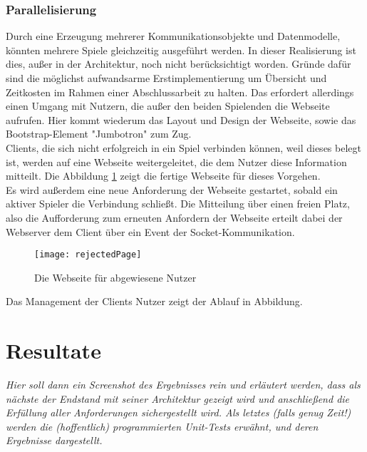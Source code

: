 \subsubsection{Parallelisierung}

Durch eine Erzeugung mehrerer Kommunikationsobjekte und Datenmodelle, könnten mehrere Spiele gleichzeitig ausgeführt werden. In dieser Realisierung ist dies, außer in der Architektur, noch nicht berücksichtigt worden. Gründe dafür sind die möglichst aufwandsarme Erstimplementierung um Übersicht und Zeitkosten im Rahmen einer Abschlussarbeit zu halten. Das erfordert allerdings einen Umgang mit Nutzern, die außer den beiden Spielenden die Webseite aufrufen. Hier kommt wiederum das Layout und Design der Webseite, sowie das Bootstrap-Element "Jumbotron" zum Zug.\\
Clients, die sich nicht erfolgreich in ein Spiel verbinden können, weil dieses belegt ist, werden auf eine Webseite weitergeleitet, die dem Nutzer diese Information mitteilt. Die Abbildung \ref{fig:rejectedPage} zeigt die fertige Webseite für dieses Vorgehen.\\ Es wird außerdem eine neue Anforderung der Webseite gestartet, sobald ein aktiver Spieler die Verbindung schließt. Die Mitteilung über einen freien Platz, also die Aufforderung zum erneuten Anfordern der Webseite erteilt dabei der Webserver dem Client über ein Event der Socket-Kommunikation.

\clearpage

\begin{figure}[htp]
	\centering
	\captionsetup{justification=centering}
	\texttt{[image: rejectedPage]}
	\caption[Webseite Abweisung]{Die Webseite für abgewiesene Nutzer}
	\label{fig:rejectedPage}
\end{figure}

\noindent Das Management der Clients \bzw Nutzer zeigt der Ablauf in Abbildung. 

\section{Resultate}
\label{sec:Resultate}

\emph{Hier soll dann ein Screenshot des Ergebnisses rein und erläutert werden, dass als nächste der Endstand mit seiner Architektur gezeigt wird und anschließend die Erfüllung aller Anforderungen sichergestellt wird. Als letztes (falls genug Zeit!) werden die (hoffentlich) programmierten Unit-Tests erwähnt, und deren Ergebnisse dargestellt.}


